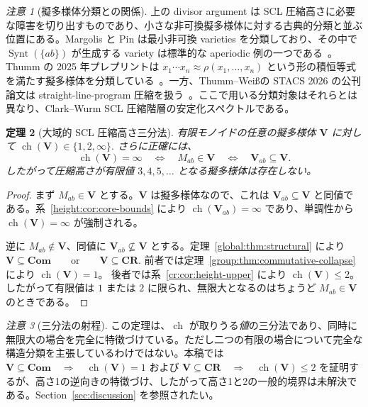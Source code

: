 \documentclass[10pt,a4paper]{ltjsarticle}
\newtheorem{theorem}{定理}[section]
\theoremstyle{definition}
\theoremstyle{remark}
\newtheorem{remark}[theorem]{注意}
\begin{document}
\begin{remark}[擬多様体分類との関係]
上の divisor argument は SCL 圧縮高さに必要な障害を切り出すものであり、小さな非可換擬多様体に対する古典的分類と並ぶ位置にある。Margolis と Pin は最小非可換 varieties を分類しており、その中で
\(\operatorname{Synt}(\{ab\})\)
が生成する variety は標準的な aperiodic 例の一つである~\cite{MargolisPin1984}。Thumm の 2025 年プレプリントは
\(x_1\cdots x_n\approx\rho(x_1,\ldots,x_n)\)
という形の積恒等式を満たす擬多様体を分類している~\cite{Thumm2025}。一方、Thumm--Wei\ss の STACS 2026 の公刊論文は straight-line-program 圧縮を扱う~\cite{ThummWeiss2026}。ここで用いる分類対象はそれらとは異なり、Clark--Wurm SCL 圧縮階層の安定化スペクトルである。
\end{remark}

\begin{theorem}[大域的 SCL 圧縮高さ三分法]
\label{global:thm:trichotomy}
有限モノイドの任意の擬多様体 \(\mathbf V\) に対して
\(
\operatorname{ch}(\mathbf V)\in\{1,2,\infty\}.
\)
さらに正確には、
\[
\operatorname{ch}(\mathbf V)=\infty
\quad\Longleftrightarrow\quad
M_{ab}\in\mathbf V
\quad\Longleftrightarrow\quad
\mathbf V_{ab}\subseteq\mathbf V.
\tag{G}
\]
したがって圧縮高さが有限値 $3,4,5,\ldots$ となる擬多様体は存在しない。
\end{theorem}

\begin{proof}
まず $M_{ab}\in\mathbf V$ とする。$\mathbf V$ は擬多様体なので、これは
$\mathbf V_{ab}\subseteq\mathbf V$
と同値である。系~\ref{height:cor:core-bounds} により
\(\operatorname{ch}(\mathbf V_{ab})=\infty\)
であり、単調性から
\(\operatorname{ch}(\mathbf V)=\infty\)
が強制される。

逆に $M_{ab}\notin\mathbf V$、同値に
$\mathbf V_{ab}\not\subseteq\mathbf V$
とする。定理~\ref{global:thm:structural} により
\(
\mathbf V\subseteq\mathbf{Com}
\qquad\text{or}\qquad
\mathbf V\subseteq\mathbf{CR}.
\)
前者では定理~\ref{group:thm:commutative-collapse} により
\(\operatorname{ch}(\mathbf V)=1\)。
後者では系~\ref{cr:cor:height-upper} により
\(\operatorname{ch}(\mathbf V)\le2\)。
したがって有限値は $1$ または $2$ に限られ、無限大となるのはちょうど $M_{ab}\in\mathbf V$ のときである。
\end{proof}

\begin{remark}[三分法の射程]
この定理は、\(\operatorname{ch}\) が取りうる\emph{値}の三分法であり、同時に無限大の場合を完全に特徴づけている。ただし二つの有限の場合について完全な構造分類を主張しているわけではない。本稿では
\(
\mathbf V\subseteq\mathbf{Com}
\quad\Longrightarrow\quad
\operatorname{ch}(\mathbf V)=1
\)
および
\(
\mathbf V\subseteq\mathbf{CR}
\quad\Longrightarrow\quad
\operatorname{ch}(\mathbf V)\le2
\)
を証明するが、高さ1の逆向きの特徴づけ、したがって高さ1と2の一般的境界は未解決である。Section~\ref{sec:discussion} を参照されたい。
\end{remark}
\end{document}
